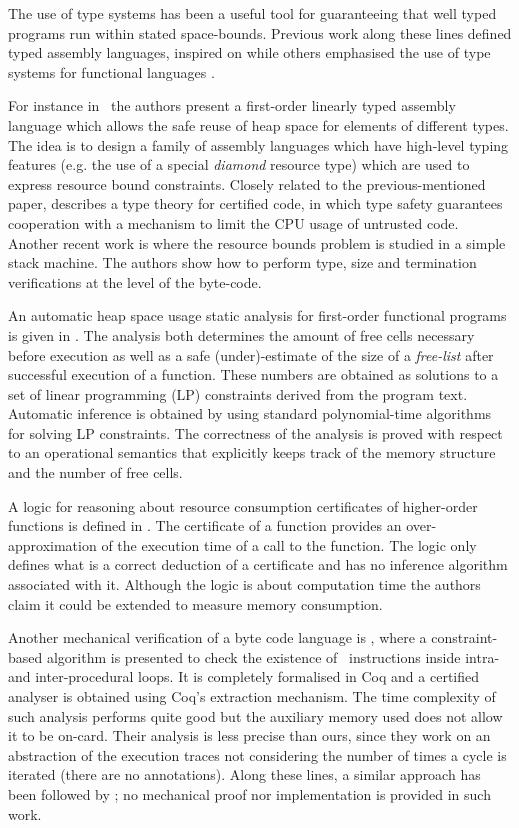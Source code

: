 The use of type systems has been a useful tool for guaranteeing that well typed programs run within stated space-bounds. Previous work along these lines defined typed assembly languages, inspired on \cite{MWCG99tal} while others emphasised the use of type systems for functional languages \cite{AH02ats,Hofmann00tsb,HP99rdd}. 


For instance in~\cite{AC03hba} the authors present a first-order linearly typed assembly language which allows the safe reuse of heap space for elements of different types. The idea is to design a family of assembly languages which have high-level typing features (e.g. the use of a special {\em diamond} resource type) which are used to express resource bound constraints. Closely related to the previous-mentioned paper, \cite{VC04fta} describes a type theory for certified code, in which type safety guarantees cooperation with a mechanism to limit the CPU usage of untrusted code. Another recent work is \cite{ACDJ04fsb} where the resource bounds problem is studied in a simple stack machine. The authors show how to perform type, size and termination verifications at the level of the byte-code.

An automatic heap space usage static analysis for first-order functional programs is given in \cite{HJ03sph}. The analysis both determines the amount of free cells necessary before execution as well as a safe (under)-estimate of the size of a \emph{free-list} after successful execution of a
function.  These numbers are obtained as solutions to a set of linear
programming (LP) constraints derived from the program text. Automatic
inference is obtained by using standard polynomial-time algorithms for
solving LP constraints. The correctness of the analysis is proved
with respect to an operational semantics that explicitly keeps track of
the memory structure and the number of free cells.

A logic for reasoning
about resource consumption certificates of higher-order functions is defined in \cite{CW00rbc}. The
certificate of a function provides an over-approximation of the
execution time of a call to the function. The logic only defines what 
is a correct deduction of a certificate and has no inference
algorithm associated with it. Although the logic is about computation time the authors claim it could be extended to measure memory consumption. 

Another mechanical verification of a byte code language is \cite{CJPS05cmu}, where a constraint-based algorithm is presented to check the existence of \new\ instructions inside intra- and inter-procedural loops. It is completely formalised in Coq and a certified analyser is obtained using Coq's extraction mechanism. The time complexity of such analysis performs quite good but the auxiliary memory used does not allow it to be on-card. Their analysis is less precise than ours, since they work on an abstraction of the execution traces not considering the number of times a cycle is iterated (there are no annotations). Along these lines, a similar approach has been followed by \cite{schneider04cba}; no mechanical proof nor implementation is provided in such work.

